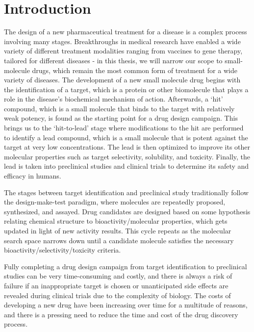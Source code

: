\chapter{Introduction} \label{ch:intro}

The design of a new pharmaceutical treatment for a disease is a complex process involving many stages. Breakthroughs in medical research have enabled a wide variety of different treatment modalities ranging from vaccines to gene therapy, tailored for different diseases - in this thesis, we will narrow our scope to small-molecule drugs, which remain the most common form of treatment for a wide variety of diseases. The development of a new small molecule drug begins with the identification of a target, which is a protein or other biomolecule that plays a role in the disease's biochemical mechanism of action. Afterwards, a `hit' compound, which is a small molecule that binds to the target with relatively weak potency, is found as the starting point for a drug design campaign. This brings us to the `hit-to-lead' stage where modifications to the hit are performed to identify a lead compound, which is a small molecule that is potent against the target at very low concentrations. The lead is then optimized to improve its other molecular properties such as target selectivity, solubility, and toxicity. Finally, the lead is taken into preclinical studies and clinical trials to determine its safety and efficacy in humans.

The stages between target identification and preclinical study traditionally follow the design-make-test paradigm, where molecules are repeatedly proposed, synthesized, and assayed. Drug candidates are designed based on some hypothesis relating chemical structure to bioactivity/molecular properties, which gets updated in light of new activity results. This cycle repeats as the molecular search space narrows down until a candidate molecule satisfies the necessary bioactivity/selectivity/toxicity criteria.

Fully completing a drug design campaign from target identification to preclinical studies can be very time-consuming and costly, and there is always a risk of failure if an inappropriate target is chosen or unanticipated side effects are revealed during clinical trials due to the complexity of biology. The costs of developing a new drug have been increasing over time for a multitude of reasons, and there is a pressing need to reduce the time and cost of the drug discovery process.

